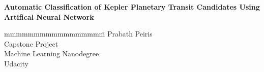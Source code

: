 \documentclass[a4paper,12pt]{report}
\begin{document}
\doublespacing

\begin{titlepage}
\vspace*{2cm}
\noindent
\begin{flushleft}
	\setlength{\baselineskip}{2\baselineskip}
	{{\Huge \bf Automatic Classification of Kepler Planetary Transit Candidates Using Artifical Neural Network}}
\end{flushleft}


\vspace{1cm}
\vspace{\fill}
\vspace{1.3cm}
\begin{tabbing}
mmmmmmmmmmmmmmmmm\= \kill
\>Prabath Peiris\\
\>Capstone Project\\
\>Machine Learning Nanodegree\\
\>Udacity\\
\> \\
\end{tabbing}
\end{titlepage}

\thispagestyle{empty}
\newlength{\origpar}
\setlength{\origpar}{\parindent}
\setlength{\parindent}{0pt}
%
\setlength{\parindent}{\origpar}
\thispagestyle{empty}
\tableofcontents
\clearpage

\renewcommand {\baselinestretch} {1.0}
\pagebreak








%
%
%
%
%
%


\end{document}

